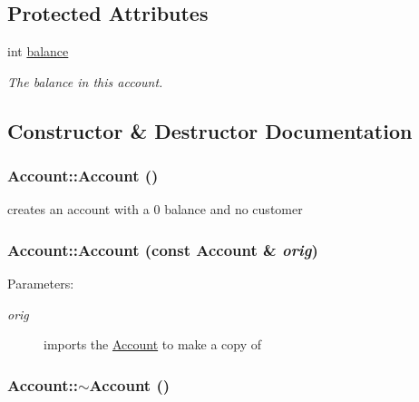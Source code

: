 \subsection*{Protected Attributes}
\begin{CompactItemize}
\item 
\hypertarget{classAccount_6012cadbf02a6fd4c3f566a8b7ab9105}{
int \hyperlink{classAccount_6012cadbf02a6fd4c3f566a8b7ab9105}{balance}}
\label{classAccount_6012cadbf02a6fd4c3f566a8b7ab9105}

\begin{CompactList}\small\item\em The balance in this account. \item\end{CompactList}\end{CompactItemize}


\subsection{Constructor \& Destructor Documentation}
\hypertarget{classAccount_366660970b5eeb5c17436062327f1b14}{
\subsubsection[Account]{\setlength{\rightskip}{0pt plus 5cm}Account::Account ()}}
\label{classAccount_366660970b5eeb5c17436062327f1b14}


creates an account with a 0 balance and no customer \hypertarget{classAccount_a7427622a35446ddc6380ef8bcc7b98a}{
\subsubsection[Account]{\setlength{\rightskip}{0pt plus 5cm}Account::Account (const {\bf Account} \& {\em orig})}}
\label{classAccount_a7427622a35446ddc6380ef8bcc7b98a}


\begin{Desc}
\item[Parameters:]
\begin{description}
\item[{\em orig}]imports the \hyperlink{classAccount}{Account} to make a copy of \end{description}
\end{Desc}
\hypertarget{classAccount_569c9ef0e42b9157690b4ceb646daba8}{
\subsubsection[$\sim$Account]{\setlength{\rightskip}{0pt plus 5cm}Account::$\sim$Account ()}}
\label{classAccount_569c9ef0e42b9157690b4ceb646daba8}


